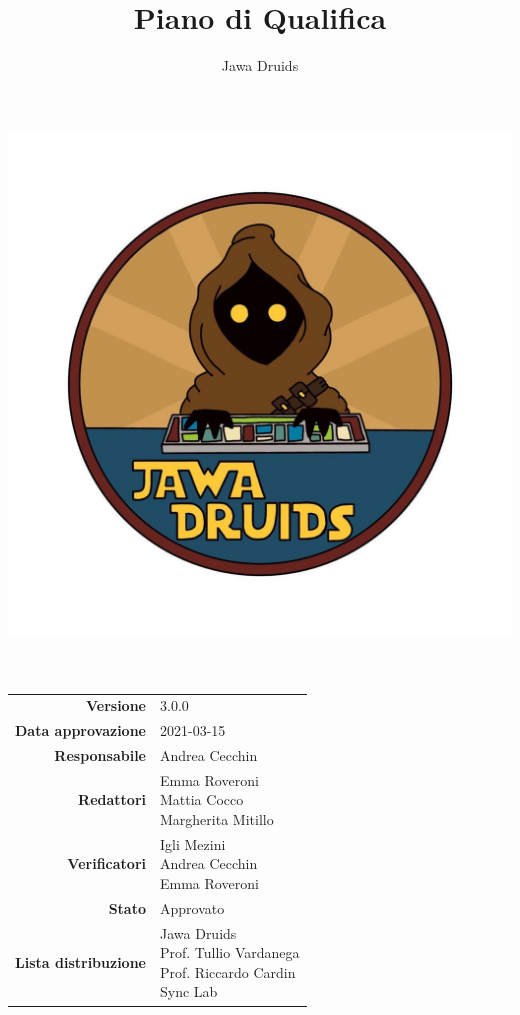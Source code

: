 



	
	\makeatletter
	\begin{titlepage}
		\begin{center}
			\vspace*{-4cm}
			\author{Jawa Druids} 
			\title{Piano di Qualifica}
			\date{} %
			\includegraphics[width=0.5\linewidth]{../immagini/DRUIDSLOGO.jpg}\\[4ex]
			{\huge \bfseries  \@title }\\[2ex] 
			{\LARGE  \@author}\\[50ex]
			\vspace*{-9cm}
			\begin{table}[H]
				\renewcommand{\arraystretch}{1.4}
				\centering
				\begin{tabular}{r | l}
					\textbf{Versione} & 3.0.0 \\%
					\textbf{Data approvazione} & 2021-03-15\\
					\textbf{Responsabile} & Andrea Cecchin\\
					\textbf{Redattori} & \makecell[tl]{ Emma Roveroni \\ Mattia Cocco \\ Margherita Mitillo} \\
					\textbf{Verificatori} & \makecell[tl]{Igli Mezini \\ Andrea Cecchin \\ Emma Roveroni} \\
					\textbf{Stato} & Approvato\\
					\textbf{Lista distribuzione} & \makecell[tl]{Jawa Druids \\ Prof. Tullio Vardanega \\ Prof. Riccardo Cardin \\ Sync Lab}\\

\end{tabular}
\end{table}
\end{center}
\end{titlepage}
